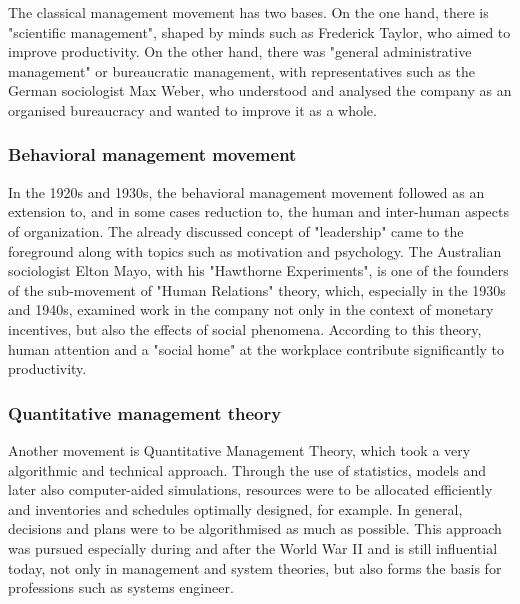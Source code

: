 \documentclass[a4paper,12pt]{scrartcl}
\begin{document}
The classical management movement has two bases. On the one hand, there is "scientific management", shaped by minds such as Frederick Taylor, who aimed to improve productivity. On the other hand, there was "general administrative management" or bureaucratic management, with representatives such as the German sociologist Max Weber, who understood and analysed the company as an organised bureaucracy and wanted to improve it as a whole.\cite{oelsnitz:2009}

\subsubsection{Behavioral management movement}
In the 1920s and 1930s, the behavioral management movement followed as an extension to, and in some cases reduction to, the human and inter-human aspects of organization. The already discussed concept of "leadership" came to the foreground along with topics such as motivation and psychology.\cite{pindur:1995} The Australian sociologist Elton Mayo, with his "Hawthorne Experiments", is one of the founders of the sub-movement of "Human Relations" theory, which, especially in the 1930s and 1940s, examined work in the company not only in the context of monetary incentives, but also the effects of social phenomena. According to this theory, human attention and a "social home" at the workplace contribute significantly to productivity.\cite{oelsnitz:2009}

\subsubsection{Quantitative management theory}
Another movement is Quantitative Management Theory, which took a very algorithmic and technical approach. Through the use of statistics, models and later also computer-aided simulations, resources were to be allocated efficiently and inventories and schedules optimally designed, for example. In general, decisions and plans were to be algorithmised as much as possible. This approach was pursued especially during and after the World War II and is still influential today, not only in management and system theories, but also forms the basis for professions such as systems engineer.\cite{hossain:2019}
\end{document}
